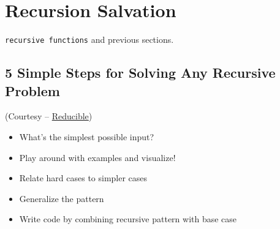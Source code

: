 \section{Recursion Salvation}
\begin{topics}
\verb!recursive functions! and previous sections.
\end{topics}
\subsection*{5 Simple Steps for Solving Any Recursive Problem}
(Courtesy -- \href{https://youtu.be/ngCos392W4w}{Reducible})
\begin{itemize}[noitemsep]
	\item What's the simplest possible input?
	\item Play around with examples and visualize!
	\item Relate hard cases to simpler cases
	\item Generalize the pattern
	\item Write code by combining recursive pattern with base case
\end{itemize}
